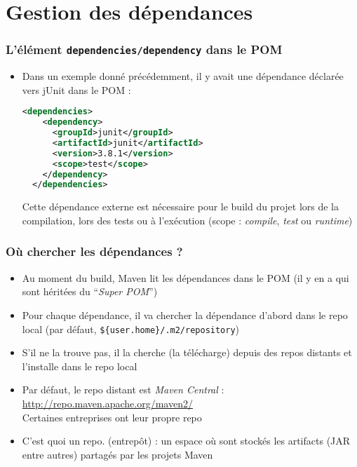 \documentclass{beamer}
\begin{document}
\section{Gestion des dépendances}
\begin{frame}[fragile]
  \frametitle{L'élément \texttt{dependencies/dependency} dans le POM}
\begin{itemize}
\item Dans un exemple donné précédemment, il y avait une dépendance déclarée
  vers jUnit dans le POM :
  \begin{lstlisting}[language=XML,basicstyle=\scriptsize]
  <dependencies>
    <dependency>
      <groupId>junit</groupId>
      <artifactId>junit</artifactId>
      <version>3.8.1</version>
      <scope>test</scope>
    </dependency>
  </dependencies>
\end{lstlisting}
Cette dépendance externe est nécessaire pour le build du projet lors
de la compilation, lors des tests ou à l'exécution (scope :
\textit{compile}, \textit{test} ou \textit{runtime})
\end{itemize}
\end{frame}

\begin{frame}[fragile]
  \frametitle{Où chercher les dépendances ?}
\begin{itemize}
\item Au moment du build, Maven lit les dépendances dans le POM (il y
  en a qui sont héritées du ``\textit{Super POM}'')
\item Pour chaque dépendance, il va chercher la dépendance d'abord
  dans le repo local (par défaut,
 {\footnotesize \texttt{\$\{user.home\}/.m2/repository}})
\item S'il ne la trouve pas, il la cherche (la télécharge) depuis des
  repos distants et l'installe dans le repo local
\item Par défaut, le repo distant est \textit{Maven Central} :\\
  {\footnotesize \url{http://repo.maven.apache.org/maven2/}}\\
  Certaines entreprises ont leur propre repo
\item C'est quoi un repo. (entrepôt) : un espace où sont stockés les
  artifacts (JAR entre autres) partagés par les projets Maven
\end{itemize}
\end{frame}
\end{document}
